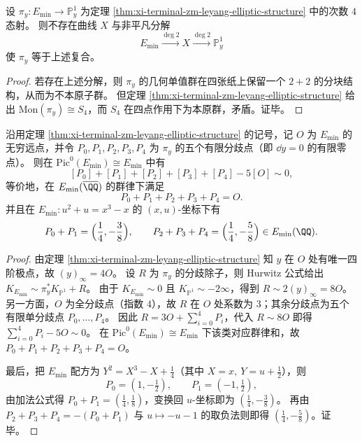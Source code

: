 \begin{corollary}\label{cor:xi-terminal-zm-leyang-cover-primitive}
设 \(\pi_y:E_{\min}\to\mathbb P^1_y\) 为定理 \ref{thm:xi-terminal-zm-leyang-elliptic-structure} 中的次数 \(4\) 态射。
则不存在曲线 \(X\) 与非平凡分解
\[
E_{\min}\xrightarrow{\deg 2}X\xrightarrow{\deg 2}\mathbb P^1_y
\]
使 \(\pi_y\) 等于上述复合。
\end{corollary}
\begin{proof}
若存在上述分解，则 \(\pi_y\) 的几何单值群在四张纸上保留一个 \(2+2\) 的分块结构，从而为不本原子群。
但定理 \ref{thm:xi-terminal-zm-leyang-elliptic-structure} 给出 \(\mathrm{Mon}(\pi_y)\cong S_4\)，而 \(S_4\) 在四点作用下为本原群，矛盾。证毕。
\end{proof}

\begin{corollary}[分歧除子的主化与有限分歧点的群律守恒]\label{cor:xi-terminal-zm-leyang-ramification-sum-zero}
沿用定理 \ref{thm:xi-terminal-zm-leyang-elliptic-structure} 的记号，记 \(O\) 为 \(E_{\min}\) 的无穷远点，并令 \(P_0,P_1,P_2,P_3,P_4\) 为 \(\pi_y\) 的五个有限分歧点（即 \(\dd y=0\) 的有限零点）。
则在 \(\mathrm{Pic}^0(E_{\min})\cong E_{\min}\) 中有
\[
[P_0]+[P_1]+[P_2]+[P_3]+[P_4]-5[O]\sim 0,
\]
等价地，在 \(E_{\min}(\overline{\QQ})\) 的群律下满足
\[
P_0+P_1+P_2+P_3+P_4=O.
\]
并且在 \(E_{\min}:u^2+u=x^3-x\) 的 \((x,u)\)-坐标下有
\[
P_0+P_1=\Bigl(\frac14,-\frac38\Bigr),\qquad
P_2+P_3+P_4=\Bigl(\frac14,-\frac58\Bigr)\in E_{\min}(\QQ).
\]
\end{corollary}
\begin{proof}
由定理 \ref{thm:xi-terminal-zm-leyang-elliptic-structure} 知 \(y\) 在 \(O\) 处有唯一四阶极点，故 \((y)_\infty=4O\)。
设 \(R\) 为 \(\pi_y\) 的分歧除子，则 Hurwitz 公式给出
\(
K_{E_{\min}}\sim \pi_y^*K_{\mathbb P^1}+R
\)。
由于 \(K_{E_{\min}}\sim 0\) 且 \(K_{\mathbb P^1}\sim-2\infty\)，得到
\(
R\sim 2(y)_\infty=8O
\)。
另一方面，\(O\) 为全分歧点（指数 \(4\)），故 \(R\) 在 \(O\) 处系数为 \(3\)；其余分歧点为五个有限单分歧点 \(P_0,\dots,P_4\)。
因此 \(R=3O+\sum_{i=0}^{4}P_i\)，代入 \(R\sim 8O\) 即得 \(\sum_{i=0}^{4}P_i-5O\sim 0\)。
在 \(\mathrm{Pic}^0(E_{\min})\cong E_{\min}\) 下该类对应群律和，故 \(P_0+P_1+P_2+P_3+P_4=O\)。
\par
最后，把 \(E_{\min}\) 配方为 \(Y^2=X^3-X+\tfrac14\)（其中 \(X=x,\ Y=u+\tfrac12\)），则
\[
P_0=(1,-\tfrac12),\qquad P_1=(-1,\tfrac12),
\]
由加法公式得 \(P_0+P_1=(\tfrac14,\tfrac18)\)，变换回 \(u\)-坐标即为 \((\tfrac14,-\tfrac38)\)。
再由 \(P_2+P_3+P_4=-(P_0+P_1)\) 与 \(u\mapsto -u-1\) 的取负法则即得 \((\tfrac14,-\tfrac58)\)。证毕。
\end{proof}


